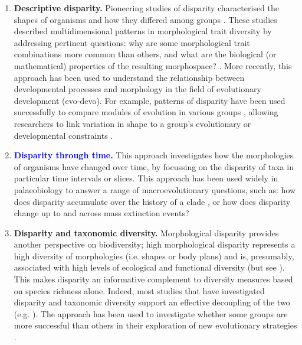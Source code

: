 \documentclass[12pt,letterpaper]{article}
\begin{document}
\begin{enumerate}

	\item \textbf{Descriptive disparity.} Pioneering studies of disparity characterised the shapes of organisms and how they differed among groups \citep{Foote1995, Briggs1992}.
	These studies described multidimensional patterns in morphological trait diversity by addressing pertinent questions: why are some morphological trait combinations more common than others, and what are the biological (or mathematical) properties of the resulting morphospace? \citep{Foote1995, Raup1961, Gerber2017}.
	More recently, this approach has been used to understand the relationship between developmental processes and morphology in the field of evolutionary development (evo-devo).
	For example, patterns of disparity have been used successfully to compare modules of evolution in various groups \citep{goswami2010influence,bardua2019morphological}, allowing researchers to link variation in shape to a group's evolutionary or developmental constraints \citep{Hipsley2017}.

	\item \textbf{\textcolor{blue}{Disparity through time}.} This approach investigates how the morphologies of organisms have changed over time, by focussing on the disparity of taxa in particular time intervals or slices.
	This approach has been used widely in palaeobiology to answer a range of macroevolutionary questions, such as: how does disparity accumulate over the history of a clade \citep{prentice2011evolution, Guillerme2018}, or how does disparity change up to and across mass extinction events\citep{Friedman2010}?

	\item \textbf{Disparity and taxonomic diversity.} Morphological disparity provides another perspective on biodiversity; high morphological disparity represents a high diversity of morphologies (i.e.
	shapes or body plans) and is, presumably, associated with high levels of ecological and functional diversity (but see \citealt{anderson2012}).
	This makes disparity an informative complement to diversity measures based on species richness alone.
	Indeed, most studies that have investigated disparity and taxonomic diversity support an effective decoupling of the two (e.g. \citealt{Fortey1996, Hopkins2013}).
	The approach has been used to investigate whether some groups are more successful than others in their exploration of new evolutionary strategies \citep{pierce2008patterns}.


\end{enumerate}
\end{document}
